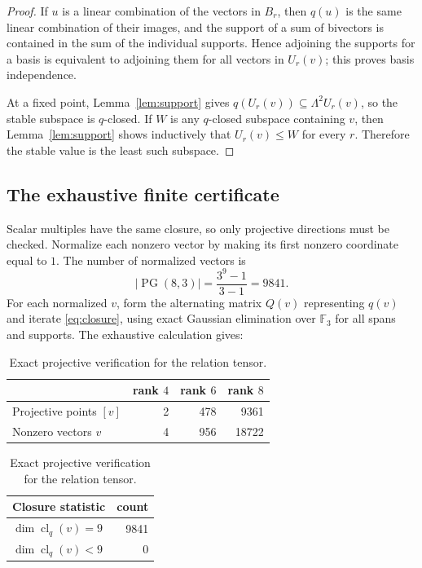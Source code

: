 \documentclass[11pt]{amsart}
\theoremstyle{definition}
\theoremstyle{remark}
\newcommand{\F}{\mathbb F}
\newcommand{\PG}{\operatorname{PG}}
\newcommand{\clq}{\operatorname{cl}_q}
\begin{document}
\begin{proof}
If $u$ is a linear combination of the vectors in $B_r$, then $q(u)$ is
the same linear combination of their images, and the support of a sum of
bivectors is contained in the sum of the individual supports.  Hence
adjoining the supports for a basis is equivalent to adjoining them for
all vectors in $U_r(v)$; this proves basis independence.

At a fixed point, Lemma~\ref{lem:support} gives
$q(U_r(v))\subseteq\Lambda^2U_r(v)$, so the stable subspace is $q$-closed.
If $W$ is any $q$-closed subspace containing $v$, then
Lemma~\ref{lem:support} shows inductively that $U_r(v)\leq W$ for every
$r$.  Therefore the stable value is the least such subspace.
\end{proof}

\subsection{The exhaustive finite certificate}\label{subsec:certificate}

Scalar multiples have the same closure, so only projective directions
must be checked.  Normalize each nonzero vector by making its first
nonzero coordinate equal to $1$.  The number of normalized vectors is
\begin{equation}\label{eq:pgcount}
                       |\PG(8,3)|=\frac{3^9-1}{3-1}=9841.
\end{equation}
For each normalized $v$, form the alternating matrix $Q(v)$ representing
$q(v)$ and iterate \eqref{eq:closure}, using exact Gaussian elimination
over $\F_3$ for all spans and supports.  The exhaustive calculation gives:

\begin{table}[ht]
\centering
\caption{Exact projective verification for the relation tensor.}
\label{tab:verification}
\begin{tabular}{@{}lrrr@{}}
\toprule
 & rank $4$ & rank $6$ & rank $8$ \\
\midrule
Projective points $[v]$ & 2 & 478 & 9361 \\
Nonzero vectors $v$     & 4 & 956 & 18722 \\
\bottomrule
\end{tabular}

\medskip
\begin{tabular}{@{}lr@{}}
\toprule
Closure statistic & count \\
\midrule
$\dim\clq(v)=9$ & 9841 \\
$\dim\clq(v)<9$ & 0 \\
\bottomrule
\end{tabular}
\end{table}
\end{document}
